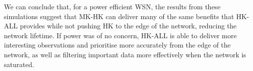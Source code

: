 We can conclude that, for a power efficient WSN, the results from these simulations suggest that MK-HK can deliver many of the same benefits that HK-ALL provides while not pushing HK to the edge of the network, reducing the network lifetime. If power was of no concern, HK-ALL is able to deliver more interesting observations and prioritise more accurately from the edge of the network, as well as filtering important data more effectively when the network is saturated.







































